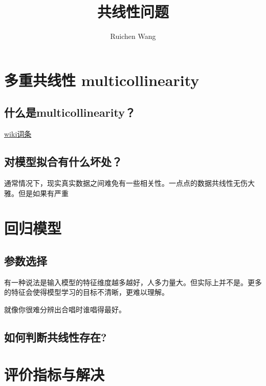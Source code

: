 \documentclass{article}
\author{Ruichen Wang}
\title{共线性问题}
\begin{document}
\begin{CJK*}{UTF8}{gbsn}

\maketitle

\section{多重共线性 multicollinearity}
\subsection{什么是multicollinearity？}
\href{https://en.wikipedia.org/wiki/Multicollinearity}{wiki词条}
\subsection{对模型拟合有什么坏处？}
通常情况下，现实真实数据之间难免有一些相关性。一点点的数据共线性无伤大雅。但是如果有严重


\section{回归模型}
\subsection{参数选择}
有一种说法是输入模型的特征维度越多越好，人多力量大。但实际上并不是。更多的特征会使得模型学习的目标不清晰，更难以理解。

就像你很难分辨出合唱时谁唱得最好。 

\subsection{如何判断共线性存在?}


\section{评价指标与解决}

\end{CJK*}
\end{document}
